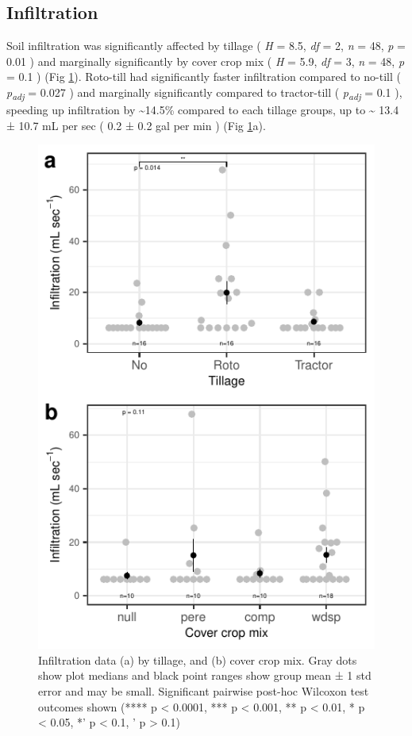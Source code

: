 \documentclass[
  12pt,
]{article}
\begin{document}
\hypertarget{infiltration}{%
\subsection{Infiltration}\label{infiltration}}

Soil infiltration was significantly affected by tillage (
\emph{H} = 8.5,
\emph{df} = 2,
\emph{n} = 48,
\emph{p} = 0.01
) and marginally significantly by cover crop mix (
\emph{H} = 5.9,
\emph{df} = 3,
\emph{n} = 48,
\emph{p} = 0.1
) (Fig \ref{fig:infilFig}).
Roto-till had significantly faster infiltration compared to no-till (
\emph{p\textsubscript{adj}} = 0.027
) and marginally significantly compared to tractor-till (
\emph{p\textsubscript{adj}} = 0.1
), speeding up infiltration by
\textasciitilde14.5\%
compared to each tillage groups,
up to
\textasciitilde{} 13.4 ±
10.7 mL per sec
(
0.2 ±
0.2 gal per min
)
(Fig \ref{fig:infilFig}a).

\begin{figure}
\centering
\includegraphics{merge_files/figure-latex/infilFig-1.pdf}
\caption{\label{fig:infilFig}Infiltration data (a) by tillage, and (b) cover crop mix. Gray dots show plot medians and black point ranges show group mean ± 1 std error and may be small. Significant pairwise post-hoc Wilcoxon test outcomes shown (**** p \textless{} 0.0001, *** p \textless{} 0.001, ** p \textless{} 0.01, * p \textless{} 0.05, *' p \textless{} 0.1, ' p \textgreater{} 0.1)}
\end{figure}
\end{document}
